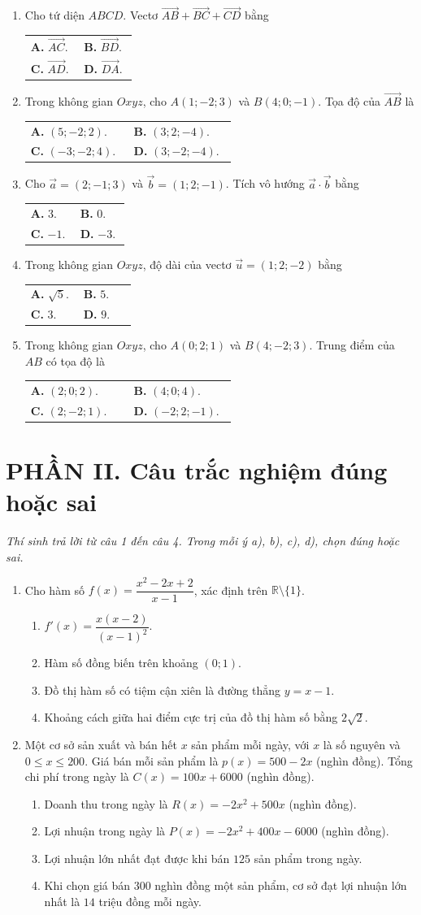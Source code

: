\documentclass[12pt,a4paper]{article}
\makeatletter
\newcommand{\bonpa}[4]{\par\nobreak\smallskip\nobreak\noindent
\begin{tabular}{@{}p{0.47\linewidth}p{0.47\linewidth}@{}}
\textbf{A.} #1 & \textbf{B.} #2\\[8pt]
\textbf{C.} #3 & \textbf{D.} #4\end{tabular}}
\makeatother
\begin{document}
\begin{enumerate}[start=8]
\item Cho tứ diện $ABCD$. Vectơ $\overrightarrow{AB}+\overrightarrow{BC}+\overrightarrow{CD}$ bằng
\bonpa{$\overrightarrow{AC}$.}{$\overrightarrow{BD}$.}{$\overrightarrow{AD}$.}{$\overrightarrow{DA}$.}

\item Trong không gian $Oxyz$, cho $A(1;-2;3)$ và $B(4;0;-1)$. Tọa độ của $\overrightarrow{AB}$ là
\bonpa{$(5;-2;2)$.}{$(3;2;-4)$.}{$(-3;-2;4)$.}{$(3;-2;-4)$.}

\item Cho $\vec a=(2;-1;3)$ và $\vec b=(1;2;-1)$. Tích vô hướng $\vec a\cdot\vec b$ bằng
\bonpa{$3$.}{$0$.}{$-1$.}{$-3$.}

\item Trong không gian $Oxyz$, độ dài của vectơ $\vec u=(1;2;-2)$ bằng
\bonpa{$\sqrt5$.}{$5$.}{$3$.}{$9$.}

\item Trong không gian $Oxyz$, cho $A(0;2;1)$ và $B(4;-2;3)$. Trung điểm của $AB$ có tọa độ là
\bonpa{$(2;0;2)$.}{$(4;0;4)$.}{$(2;-2;1)$.}{$(-2;2;-1)$.}
\end{enumerate}

\section*{\large PHẦN II. Câu trắc nghiệm đúng hoặc sai}
\textit{Thí sinh trả lời từ câu 1 đến câu 4. Trong mỗi ý a), b), c), d), chọn đúng hoặc sai.}
\begin{enumerate}
\item Cho hàm số $f(x)=\dfrac{x^2-2x+2}{x-1}$, xác định trên $\mathbb R\setminus\{1\}$.
\begin{enumerate}
\item $f'(x)=\dfrac{x(x-2)}{(x-1)^2}$.
\item Hàm số đồng biến trên khoảng $(0;1)$.
\item Đồ thị hàm số có tiệm cận xiên là đường thẳng $y=x-1$.
\item Khoảng cách giữa hai điểm cực trị của đồ thị hàm số bằng $2\sqrt2$.
\end{enumerate}

\item Một cơ sở sản xuất và bán hết $x$ sản phẩm mỗi ngày, với $x$ là số nguyên và $0\le x\le200$.
Giá bán mỗi sản phẩm là $p(x)=500-2x$ (nghìn đồng). Tổng chi phí trong ngày là
$C(x)=100x+6000$ (nghìn đồng).
\begin{enumerate}
\item Doanh thu trong ngày là $R(x)=-2x^2+500x$ (nghìn đồng).
\item Lợi nhuận trong ngày là $P(x)=-2x^2+400x-6000$ (nghìn đồng).
\item Lợi nhuận lớn nhất đạt được khi bán $125$ sản phẩm trong ngày.
\item Khi chọn giá bán $300$ nghìn đồng một sản phẩm, cơ sở đạt lợi nhuận lớn nhất là $14$ triệu đồng mỗi ngày.
\end{enumerate}
\end{enumerate}
\end{document}
